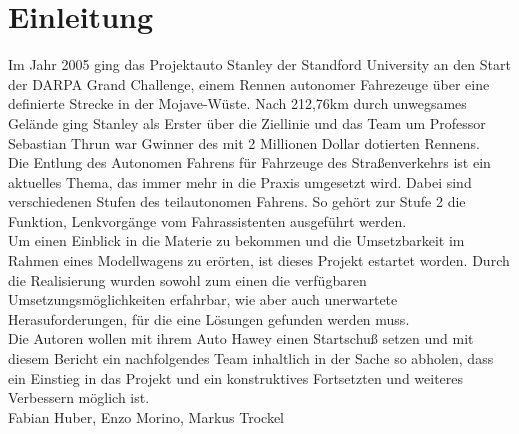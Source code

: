 \section{Einleitung}
Im Jahr 2005 ging das Projektauto Stanley der Standford University an den Start
der DARPA Grand Challenge, einem Rennen autonomer Fahrezeuge über eine
definierte Strecke in der Mojave-Wüste. Nach 212,76km durch unwegsames Gelände
ging Stanley als Erster über die Ziellinie und das Team um Professor Sebastian
Thrun war Gwinner des mit 2 Millionen Dollar dotierten Rennens.\\
Die Entlung des Autonomen Fahrens für Fahrzeuge des Straßenverkehrs ist ein
aktuelles Thema, das immer mehr in die Praxis umgesetzt wird. Dabei sind
verschiedenen Stufen des teilautonomen Fahrens. So gehört zur Stufe 2 die
Funktion, Lenkvorgänge vom Fahrassistenten ausgeführt werden.\\
Um einen Einblick in die Materie zu bekommen und die Umsetzbarkeit im Rahmen eines 
Modellwagens zu erörten, ist dieses Projekt estartet worden. Durch die Realisierung 
wurden sowohl zum einen die verfügbaren Umsetzungsmöglichkeiten erfahrbar, wie aber 
auch unerwartete Herasuforderungen, für die eine Lösungen gefunden werden muss.\\
Die Autoren wollen mit ihrem Auto Hawey einen Startschuß setzen und mit diesem
Bericht ein nachfolgendes Team inhaltlich in der Sache so abholen, dass ein
Einstieg in das Projekt und ein konstruktives Fortsetzten und weiteres Verbessern 
möglich ist.\\

Fabian Huber, Enzo Morino, Markus Trockel
